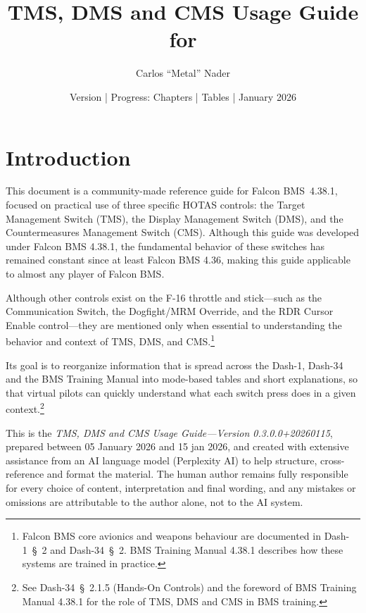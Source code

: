 \documentclass[11pt,a4paper]{article}
\title{TMS, DMS and CMS Usage Guide for \bmsver}
\author{Carlos ``Metal'' Nader}
\date{Version \fulldocversion{} | Progress: Chapters \chapterscompletedof{} | Tables \tablesfilledpct{} | January 2026}
\providecommand{\dashref}[1]{Dash-34~\S~#1}
\providecommand{\dashone}[1]{Dash-1~\S~#1}
\providecommand{\trnman}{BMS Training Manual 4.38.1}
\providecommand{\bmsver}{Falcon BMS~4.38.1}
\newcommand{\docversion}{0.3.0.0} %
\newcommand{\docbuild}{20260115}
\newcommand{\docstartdate}{05 January 2026}
\newcommand{\docenddate}{15 jan 2026}
\newcommand{\fulldocversion}{\docversion+\docbuild} %
\begin{document}
\maketitle

\newpage
\tableofcontents
\newpage
{}

\section{Introduction}

This document is a community-made reference guide for \bmsver, focused on practical use of three specific HOTAS controls: the Target Management Switch (TMS), the Display Management Switch (DMS), and the Countermeasures Management Switch (CMS). Although this guide was developed under Falcon BMS 4.38.1, the fundamental behavior of these switches has remained constant since at least Falcon BMS 4.36, making this guide applicable to almost any player of Falcon BMS.

Although other controls exist on the F-16 throttle and stick---such as the Communication Switch, the Dogfight/MRM Override, and the RDR Cursor Enable control---they are mentioned only when essential to understanding the behavior and context of TMS, DMS, and CMS.\footnote{Falcon BMS core avionics and weapons behaviour are documented in \dashone{2} and \dashref{2}. \trnman{} describes how these systems are trained in practice.}

Its goal is to reorganize information that is spread across the Dash-1, Dash-34 and the BMS Training Manual into mode-based tables and short explanations, so that virtual pilots can quickly understand what each switch press does in a given context.\footnote{See \dashref{2.1.5} (Hands-On Controls) and the foreword of \trnman{} for the role of TMS, DMS and CMS in BMS training.}

This is the \emph{TMS, DMS and CMS Usage Guide---Version \fulldocversion}, prepared between \docstartdate{} and \docenddate{}, and created with extensive assistance from an AI language model (Perplexity AI) to help structure, cross-reference and format the material. The human author remains fully responsible for every choice of content, interpretation and final wording, and any mistakes or omissions are attributable to the author alone, not to the AI system.
\end{document}
